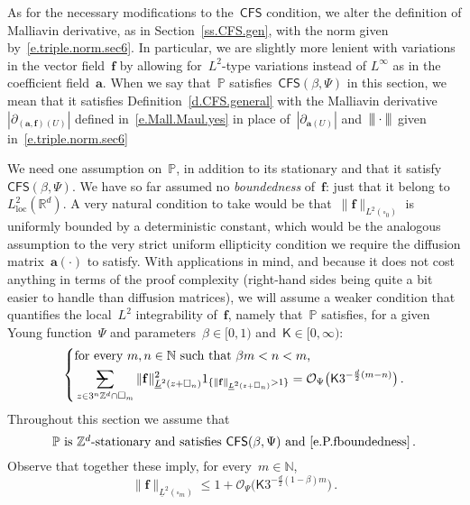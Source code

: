 \documentclass[11pt]{article} %
\makeatletter
\let\oldsquare\square %
\renewcommand{\square}{\oldsquare}
\numberwithin{equation}{section}
\theoremstyle{definition}
\let\originalleft\left
\let\originalright\right
\renewcommand{\left}{\mathopen{}\mathclose\bgroup\originalleft}
\renewcommand{\right}{\aftergroup\egroup\originalright}
\newcommand{\vertiii}{\vert\kern-0.3ex\vert\kern-0.25ex\vert}
\newcommand*{\N}{\ensuremath{\mathbb{N}}}
\newcommand*{\Z}{\ensuremath{\mathbb{Z}}}
\newcommand*{\Zd}{\ensuremath{\mathbb{Z}^d}}
\newcommand*{\Rd}{\ensuremath{\mathbb{R}^d}}
\newcommand{\f}{\mathbf{f}}
\renewcommand{\a}{\mathbf{a}}
\newcommand{\cu}{\square}
\renewcommand{\P}{\mathbb{P}}
\renewcommand{\O}{\mathcal{O}}
\newcommand{\indc}{1}
\newcommand{\avsum}{\mathop{\mathpalette\avsuminner\relax}\displaylimits}
\newcommand\avsuminner[2]{%
  {\sbox0{$\m@th#1\sum$}%
   \vphantom{\usebox0}%
   \ooalign{%
     \hidewidth
     \smash{\,\rule[.23em]{8.8pt}{1.1pt} \relax}%
     \hidewidth\cr
     $\m@th#1\sum$\cr
   }%
  }%
}
\newcommand{\CFS}{\mathsf{CFS}}
\makeatother
\begin{document}
\smallskip

As for the necessary modifications to the~$\CFS$ condition, we alter the definition of Malliavin derivative, as in Section~\ref{ss.CFS.gen}, with the norm given by~\eqref{e.triple.norm.sec6}. 
In particular, we are slightly more lenient with variations in the vector field~$\f$ by allowing for~$L^2$-type variations instead of $L^\infty$ as in the coefficient field~$\a$. When we say that~$\P$ satisfies~$\CFS(\beta,\Psi)$ in this section, we mean that it satisfies Definition~\ref{d.CFS.general} with the Malliavin derivative~$|\partial_{(\a,\f)(U)}|$ defined in~\eqref{e.Mall.Maul.yes} in place of~$|\partial_{\a(U)}|$ and~$\vertiii\cdot\vertiii$ given in~\eqref{e.triple.norm.sec6} 

\smallskip

We need one assumption on~$\P$, in addition to its stationary and that it satisfy~$\CFS(\beta,\Psi)$. We have so far assumed no \emph{boundedness} of~$\f$: just that it belong to~$L^2_{\mathrm{loc}}(\Rd)$. 
A very natural condition to take would be that~$\| \f \|_{L^2(\cu_0)}$ is uniformly bounded by a deterministic constant, which would be the analogous assumption to the very strict uniform ellipticity condition we require the diffusion matrix~$\a(\cdot)$ to satisfy. 
With applications in mind, and because it does not cost anything in terms of the proof complexity (right-hand sides being quite a bit easier to handle than diffusion matrices), 
we will assume a weaker condition that quantifies the local~$L^2$ integrability of~$\f$, namely that~$\P$ satisfies, for a given Young function~$\Psi$ and parameters~$\beta \in [0,1)$ and~$\mathsf{K}\in [0,\infty)$:
\begin{equation}
\label{e.P.fboundedness}
\left\{
\begin{aligned}
& \mbox{for every $m,n \in \N$ such that  $\beta m < n < m$, }
\\ & 
\avsum_{z \in 3^{n} \Z^d  \cap \cu_m} 
\| \f \|_{\underline{L}^2(z + \cu_n)}^2 \indc_{\{ \| \f \|_{\underline{L}^2(z + \cu_n)}  > 1 \} } 
= \O_\Psi\bigl(\mathsf{K}  3^{-\frac d2 (m-n) } \bigr)
\,.
\end{aligned}
\right.
\end{equation}
Throughout this section we assume that
\begin{equation} 
\label{e.f.sec.ass}
\P \mbox{ is~$\Zd$-stationary and satisfies $\CFS(\beta,\Psi)$ and~\eqref{e.P.fboundedness}}
\,.
\end{equation}
Observe that together these imply, for every~$m\in\N$, 
\begin{equation}
\label{e.f.dumbbound}
\| \f \|_{\underline{L}^2(\cu_m)} 
\leq 
1 +  \O_\Psi\bigl(\mathsf{K}  3^{-\frac d2 (1-\beta) m} \bigr)\,.
\end{equation}
\end{document}
